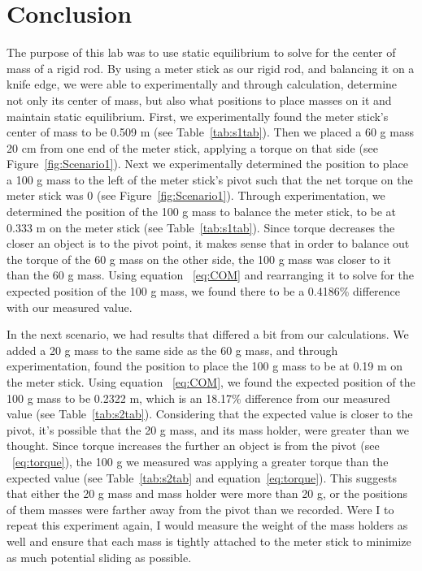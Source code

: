 
\section{Conclusion}

\vspace{-0.5cm}
\singlespacing

The purpose of this lab was to use static equilibrium to solve for the center of mass of a rigid rod. By using a meter stick as our rigid rod, and balancing it on a knife edge, we were able to experimentally and through calculation, determine not only its center of mass, but also what positions to place masses on it and maintain static equilibrium. First, we experimentally found the meter stick's center of mass to be 0.509 m (see Table~\ref{tab:s1tab}). Then we placed a 60 g mass 20 cm from one end of the meter stick, applying a torque on that side (see Figure~\ref{fig:Scenario1}). Next we experimentally determined the position to place a 100 g mass to the left of the meter stick's pivot such that the net torque on the meter stick was 0 (see Figure~\ref{fig:Scenario1}). Through experimentation, we determined the position of the 100 g mass to balance the meter stick, to be at 0.333 m on the meter stick (see Table~\ref{tab:s1tab}). Since torque decreases the closer an object is to the pivot point, it makes sense that in order to balance out the torque of the 60 g mass on the other side, the 100 g mass was closer to it than the 60 g mass. Using equation ~\ref{eq:COM} and rearranging it to solve for the expected position of the 100 g mass, we found there to be a 0.4186\% difference with our measured value. 

In the next scenario, we had results that differed a bit from our calculations. We added a 20 g mass to the same side as the 60 g mass, and through experimentation, found the position to place the 100 g mass to be at 0.19 m on the meter stick. Using equation ~\ref{eq:COM}, we found the expected position of the 100 g mass to be 0.2322 m, which is an 18.17\% difference from our measured value (see Table~\ref{tab:s2tab}). Considering that the expected value is closer to the pivot, it's possible that the 20 g mass, and its mass holder, were greater than we thought. Since torque increases the further an object is from the pivot (see ~\ref{eq:torque}), the 100 g we measured was applying a greater torque than the expected value (see Table~\ref{tab:s2tab} and equation~\ref{eq:torque}). This suggests that either the 20 g mass and mass holder were more than 20 g, or the positions of them masses were farther away from the pivot than we recorded. Were I to repeat this experiment again, I would measure the weight of the mass holders as well and ensure that each mass is tightly attached to the meter stick to minimize as much potential sliding as possible. 

